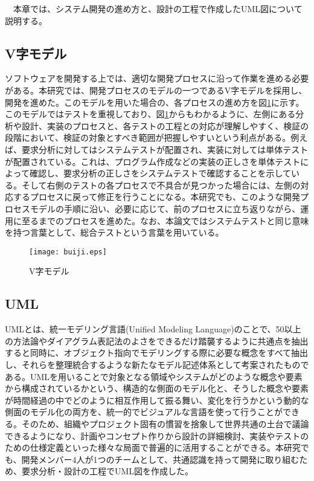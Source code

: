 　本章では、システム開発の進め方と、設計の工程で作成したUML図について説明する。

\subsection*{V字モデル\cite{kumikomi}}
ソフトウェアを開発する上では、適切な開発プロセスに沿って作業を進める必要がある。本研究では、開発プロセスのモデルの一つであるV字モデルを採用し、開発を進めた。このモデルを用いた場合の、各プロセスの進め方を図\ref{buiji}に示す。このモデルではテストを重視しており、図\ref{buiji}からもわかるように、左側にある分析や設計、実装のプロセスと、各テストの工程との対応が理解しやすく、検証の段階において、検証の対象とすべき範囲が把握しやすいという利点がある。例えば、要求分析に対してはシステムテストが配置され、実装に対しては単体テストが配置されている。これは、プログラム作成などの実装の正しさを単体テストによって確認し、要求分析の正しさをシステムテストで確認することを示している。そして右側のテストの各プロセスで不具合が見つかった場合には、左側の対応するプロセスに戻って修正を行うことになる。本研究でも、このような開発プロセスモデルの手順に沿い、必要に応じて、前のプロセスに立ち返りながら、運用に至るまでのプロセスを進めた。なお、本論文ではシステムテストと同じ意味を持つ言葉として、総合テストという言葉を用いている。

\begin{figure}[htbp]
	\centering
	\texttt{[image: buiji.eps]}
	\caption{V字モデル}
	\label{buiji}
\end{figure}


\subsection*{UML\cite{uml}}
UMLとは、統一モデリング言語(Unified Modeling Language)のことで、50以上の方法論やダイアグラム表記法のよさをできるだけ踏襲するように共通点を抽出すると同時に、オブジェクト指向でモデリングする際に必要な概念をすべて抽出し、それらを整理統合するような新たなモデル記述体系として考案されたものである。UMLを用いることで対象となる領域やシステムがどのような概念や要素から構成されているかという、構造的な側面のモデル化と、そうした概念や要素が時間経過の中でどのように相互作用して振る舞い、変化を行うかという動的な側面のモデル化の両方を、統一的でビジュアルな言語を使って行うことができる。そのため、組織やプロジェクト固有の慣習を捨象して世界共通の土台で議論できるようになり、計画やコンセプト作りから設計の詳細検討、実装やテストのための仕様定義といった様々な局面で普遍的に活用することができる。本研究でも、開発メンバー4人が1つのチームとして、共通認識を持って開発に取り組むため、要求分析・設計の工程でUML図を作成した。

